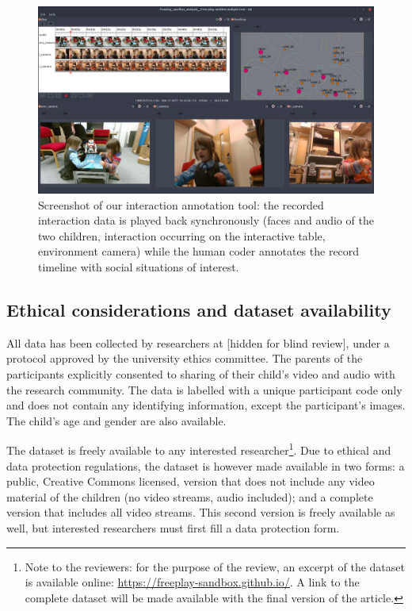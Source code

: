 \documentclass{article}
\begin{document}
\begin{figure}[th!]
    \centering
    \includegraphics[width=0.8\linewidth]{analysis}
    \caption{Screenshot of our interaction annotation tool: the recorded interaction data
    is played back synchronously (faces and audio of the two children,
    interaction occurring on the interactive table, environment camera) while the human coder
    annotates the record timeline with social situations of interest.}
    \label{fig|analysis}
\end{figure}

%
%


\subsection{Ethical considerations and dataset availability}
\label{availability}

All data has been collected by researchers at
[hidden for blind review], under a
protocol approved by the university ethics committee. The parents of the
participants explicitly consented to sharing of their child's video and audio
with the research community. The data is labelled with a unique participant code
only and does not contain any identifying information, except the participant's
images. The child's age and gender are also available.

The dataset is freely available to any interested researcher\footnote{Note to
the reviewers: for the purpose of the review, an excerpt of the dataset is
available online: \url{https://freeplay-sandbox.github.io/}. A link to the
complete dataset will be made available with the final version of the article.}.
Due to ethical and data protection regulations, the dataset is however made
available in two forms: a public, Creative Commons licensed, version that does
not include any video material of the children (no video streams, audio
included); and a complete version that includes all video streams. This second
version is freely available as well, but interested researchers must first fill
a data protection form.
\end{document}
